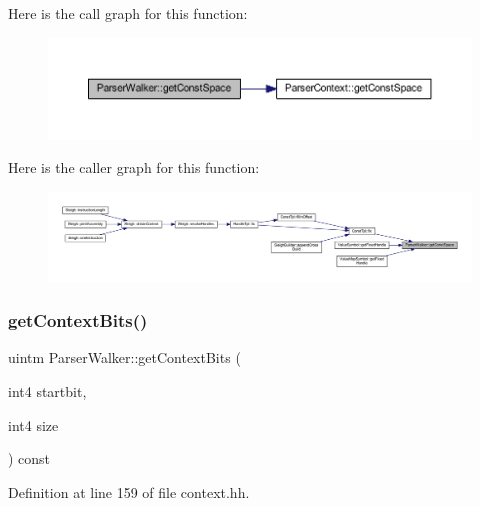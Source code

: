 Here is the call graph for this function\+:
\nopagebreak
\begin{figure}[H]
\begin{center}
\leavevmode
\includegraphics[width=350pt]{class_parser_walker_ab353bd7e91219577f2d9aff400e84c80_cgraph}
\end{center}
\end{figure}
Here is the caller graph for this function\+:
\nopagebreak
\begin{figure}[H]
\begin{center}
\leavevmode
\includegraphics[width=350pt]{class_parser_walker_ab353bd7e91219577f2d9aff400e84c80_icgraph}
\end{center}
\end{figure}
\mbox{\label{class_parser_walker_ae38ea0339696eeeec219b3d36d35e5ac}} 
\subsubsection{\texorpdfstring{getContextBits()}{getContextBits()}}
{\footnotesize\ttfamily uintm Parser\+Walker\+::get\+Context\+Bits (\begin{DoxyParamCaption}\item[{int4}]{startbit,  }\item[{int4}]{size }\end{DoxyParamCaption}) const\hspace{0.3cm}{\ttfamily [inline]}}



Definition at line 159 of file context.\+hh.

